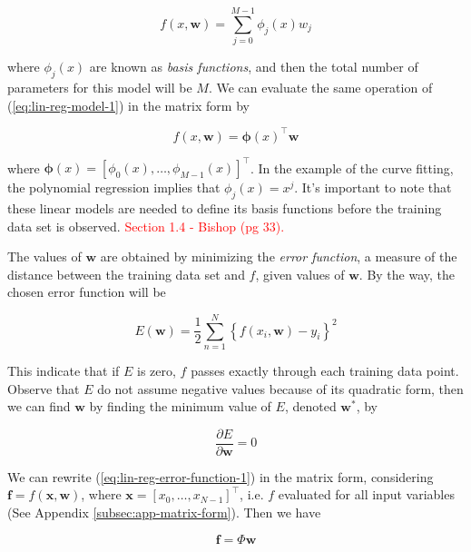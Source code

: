 \documentclass[11pt]{article} %
\begin{document}
\begin{equation}
   f(x,\mathbf{w}) = \sum_{j=0}^{M-1} \phi_j (x) w_j 
   \label{eq:lin-reg-model-1}
\end{equation}

where $\phi_j (x)$ are known as \textit{basis functions}, and then the total number of parameters for this model will be $M$. We can evaluate the same operation of (\ref{eq:lin-reg-model-1}) in the matrix form by

\begin{equation}
   f(x,\mathbf{w}) = \boldsymbol{\phi}(x)^\top  \mathbf{w}
   \label{eq:lin-reg-model-1-matrix-form}
\end{equation}

where $\boldsymbol{\phi}(x) = \left[ \phi_0(x), \dots, \phi_{M-1}(x) \right]^\top$. In the example of the curve fitting, the polynomial regression implies that $\phi_j(x)=x^j$. It's important to note that these linear models are needed to define its basis functions before the training data set is observed. \textcolor{red}{Section 1.4 - Bishop (pg 33).}

The values of $\mathbf{w}$ are obtained by minimizing the \textit{error function}, a measure of the distance between the training data set and $f$, given values of $\mathbf{w}$. By the way, the chosen error function will be 

\begin{equation}
   E(\mathbf{w}) = \frac{1}{2} \sum_{n=1}^N \left\{ f(x_i,\mathbf{w})-y_i \right\}^2
   \label{eq:lin-reg-error-function-1}
\end{equation}

This indicate that if $E$ is zero, $f$ passes exactly through each training data point. Observe that $E$ do not assume negative values because of its quadratic form, then we can find $\mathbf{w}$ by finding the minimum value of $E$, denoted $\mathbf{w^*}$, by

\begin{equation}
   \frac{\partial E}{\partial \mathbf{w}} = 0
\end{equation}

We can rewrite (\ref{eq:lin-reg-error-function-1}) in the matrix form, considering $\mathbf{f} = f(\mathbf{x},\mathbf{w})$, where $\mathbf{x}=\left[ x_0,\dots, x_{N-1} \right]^\top$, i.e. $f$ evaluated for all input variables (See Appendix \ref{subsec:app-matrix-form}). Then we have

\begin{equation}
   \label{eq:lin-reg-error-function-matrix-form}
   \mathbf{f} = \Phi \mathbf{w}
\end{equation}
\end{document}
